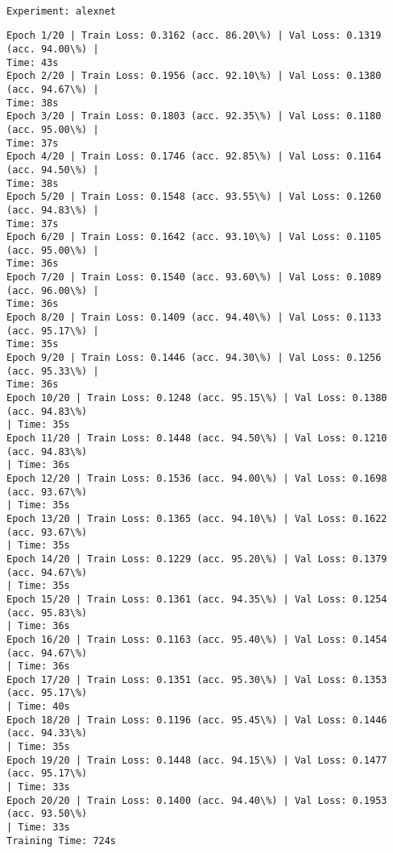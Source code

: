 \documentclass[8pt]{extarticle}
\begin{document}
    \begin{Verbatim}[commandchars=\\\{\}]

Experiment: alexnet
    \end{Verbatim}

    \begin{Verbatim}[commandchars=\\\{\}]
Epoch 1/20 | Train Loss: 0.3162 (acc. 86.20\%) | Val Loss: 0.1319 (acc. 94.00\%) |
Time: 43s
Epoch 2/20 | Train Loss: 0.1956 (acc. 92.10\%) | Val Loss: 0.1380 (acc. 94.67\%) |
Time: 38s
Epoch 3/20 | Train Loss: 0.1803 (acc. 92.35\%) | Val Loss: 0.1180 (acc. 95.00\%) |
Time: 37s
Epoch 4/20 | Train Loss: 0.1746 (acc. 92.85\%) | Val Loss: 0.1164 (acc. 94.50\%) |
Time: 38s
Epoch 5/20 | Train Loss: 0.1548 (acc. 93.55\%) | Val Loss: 0.1260 (acc. 94.83\%) |
Time: 37s
Epoch 6/20 | Train Loss: 0.1642 (acc. 93.10\%) | Val Loss: 0.1105 (acc. 95.00\%) |
Time: 36s
Epoch 7/20 | Train Loss: 0.1540 (acc. 93.60\%) | Val Loss: 0.1089 (acc. 96.00\%) |
Time: 36s
Epoch 8/20 | Train Loss: 0.1409 (acc. 94.40\%) | Val Loss: 0.1133 (acc. 95.17\%) |
Time: 35s
Epoch 9/20 | Train Loss: 0.1446 (acc. 94.30\%) | Val Loss: 0.1256 (acc. 95.33\%) |
Time: 36s
Epoch 10/20 | Train Loss: 0.1248 (acc. 95.15\%) | Val Loss: 0.1380 (acc. 94.83\%)
| Time: 35s
Epoch 11/20 | Train Loss: 0.1448 (acc. 94.50\%) | Val Loss: 0.1210 (acc. 94.83\%)
| Time: 36s
Epoch 12/20 | Train Loss: 0.1536 (acc. 94.00\%) | Val Loss: 0.1698 (acc. 93.67\%)
| Time: 35s
Epoch 13/20 | Train Loss: 0.1365 (acc. 94.10\%) | Val Loss: 0.1622 (acc. 93.67\%)
| Time: 35s
Epoch 14/20 | Train Loss: 0.1229 (acc. 95.20\%) | Val Loss: 0.1379 (acc. 94.67\%)
| Time: 35s
Epoch 15/20 | Train Loss: 0.1361 (acc. 94.35\%) | Val Loss: 0.1254 (acc. 95.83\%)
| Time: 36s
Epoch 16/20 | Train Loss: 0.1163 (acc. 95.40\%) | Val Loss: 0.1454 (acc. 94.67\%)
| Time: 36s
Epoch 17/20 | Train Loss: 0.1351 (acc. 95.30\%) | Val Loss: 0.1353 (acc. 95.17\%)
| Time: 40s
Epoch 18/20 | Train Loss: 0.1196 (acc. 95.45\%) | Val Loss: 0.1446 (acc. 94.33\%)
| Time: 35s
Epoch 19/20 | Train Loss: 0.1448 (acc. 94.15\%) | Val Loss: 0.1477 (acc. 95.17\%)
| Time: 33s
Epoch 20/20 | Train Loss: 0.1400 (acc. 94.40\%) | Val Loss: 0.1953 (acc. 93.50\%)
| Time: 33s
Training Time: 724s
    \end{Verbatim}

    \begin{center}
    \end{center}
    { \hspace*{\fill} \\}
    
\end{document}

